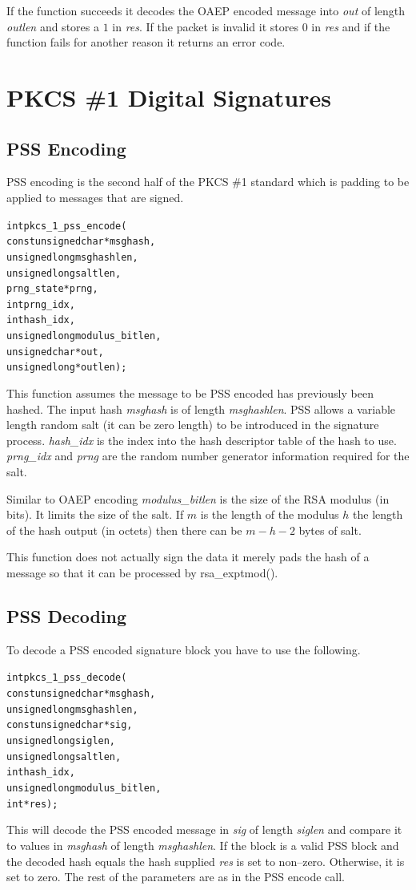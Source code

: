 \documentclass[synpaper]{book}
\newcommand{\mysection}[1]    %
	{                   %
	\section{#1}
   \markboth{\textsf{www.libtom.net}}{\thesection ~ {#1}}
	}
\begin{document}
If the function succeeds it decodes the OAEP encoded message into \textit{out} of length \textit{outlen} and stores a
$1$ in \textit{res}.  If the packet is invalid it stores $0$ in \textit{res} and if the function fails for another reason
it returns an error code.

\mysection{PKCS \#1 Digital Signatures}

\subsection{PSS Encoding}
PSS encoding is the second half of the PKCS \#1 standard which is padding to be applied to messages that are signed.

\begin{alltt}
int pkcs_1_pss_encode(
    const unsigned char *msghash,
          unsigned long  msghashlen,
          unsigned long  saltlen,
             prng_state *prng,
                    int  prng_idx,
                    int  hash_idx,
          unsigned long  modulus_bitlen,
          unsigned char *out,
          unsigned long *outlen);
\end{alltt}

This function assumes the message to be PSS encoded has previously been hashed.  The input hash \textit{msghash} is of length
\textit{msghashlen}.  PSS allows a variable length random salt (it can be zero length) to be introduced in the signature process.
\textit{hash\_idx} is the index into the hash descriptor table of the hash to use.  \textit{prng\_idx} and \textit{prng} are the random
number generator information required for the salt.

Similar to OAEP encoding \textit{modulus\_bitlen} is the size of the RSA modulus (in bits).  It limits the size of the salt.  If $m$ is the length
of the modulus $h$ the length of the hash output (in octets) then there can be $m - h - 2$ bytes of salt.

This function does not actually sign the data it merely pads the hash of a message so that it can be processed by rsa\_exptmod().

\subsection{PSS Decoding}

To decode a PSS encoded signature block you have to use the following.

\begin{alltt}
int pkcs_1_pss_decode(
    const unsigned char *msghash,
          unsigned long  msghashlen,
    const unsigned char *sig,
          unsigned long  siglen,
          unsigned long  saltlen,
                    int  hash_idx,
          unsigned long  modulus_bitlen,
                    int *res);
\end{alltt}
This will decode the PSS encoded message in \textit{sig} of length \textit{siglen} and compare it to values in \textit{msghash} of length
\textit{msghashlen}.  If the block is a valid PSS block and the decoded hash equals the hash supplied \textit{res} is set to non--zero.  Otherwise,
it is set to zero.  The rest of the parameters are as in the PSS encode call.
\end{document}
